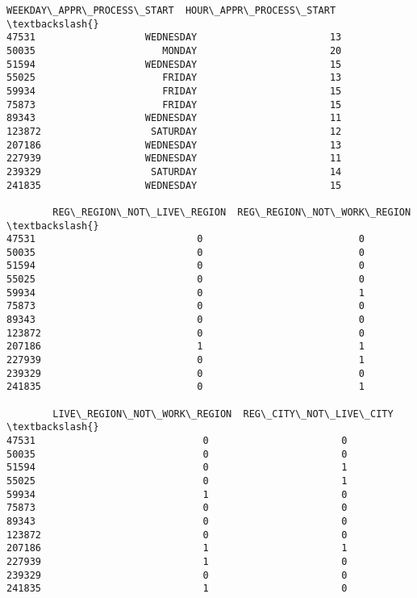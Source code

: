 \documentclass[11pt]{article}
\begin{document}
\begin{tcolorbox}[breakable, size=fbox, boxrule=.5pt, pad at break*=1mm, opacityfill=0]
\begin{Verbatim}[commandchars=\\\{\}]
       WEEKDAY\_APPR\_PROCESS\_START  HOUR\_APPR\_PROCESS\_START  \textbackslash{}
47531                   WEDNESDAY                       13
50035                      MONDAY                       20
51594                   WEDNESDAY                       15
55025                      FRIDAY                       13
59934                      FRIDAY                       15
75873                      FRIDAY                       15
89343                   WEDNESDAY                       11
123872                   SATURDAY                       12
207186                  WEDNESDAY                       13
227939                  WEDNESDAY                       11
239329                   SATURDAY                       14
241835                  WEDNESDAY                       15

        REG\_REGION\_NOT\_LIVE\_REGION  REG\_REGION\_NOT\_WORK\_REGION  \textbackslash{}
47531                            0                           0
50035                            0                           0
51594                            0                           0
55025                            0                           0
59934                            0                           1
75873                            0                           0
89343                            0                           0
123872                           0                           0
207186                           1                           1
227939                           0                           1
239329                           0                           0
241835                           0                           1

        LIVE\_REGION\_NOT\_WORK\_REGION  REG\_CITY\_NOT\_LIVE\_CITY  \textbackslash{}
47531                             0                       0
50035                             0                       0
51594                             0                       1
55025                             0                       1
59934                             1                       0
75873                             0                       0
89343                             0                       0
123872                            0                       0
207186                            1                       1
227939                            1                       0
239329                            0                       0
241835                            1                       0


\end{Verbatim}
\end{tcolorbox}
\end{document}
